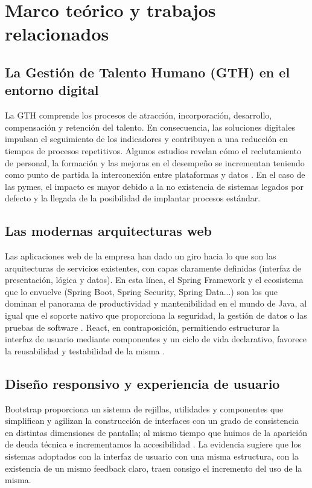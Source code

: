 \section{Marco teórico y trabajos relacionados}

\subsection{La Gestión de Talento Humano (GTH) en el entorno digital}
La GTH comprende los procesos de atracción, incorporación, desarrollo, compensación y retención del talento. En consecuencia, las soluciones digitales impulsan el seguimiento de los indicadores y contribuyen a una reducción en tiempos de procesos repetitivos. Algunos estudios revelan cómo el reclutamiento de personal, la formación y las mejoras en el desempeño se incrementan teniendo como punto de partida la interconexión entre plataformas y datos \cite{gestion_talento_digital}. En el caso de las pymes, el impacto es mayor debido a la no existencia de sistemas legados por defecto y la llegada de la posibilidad de implantar procesos estándar.

\subsection{Las modernas arquitecturas web}
Las aplicaciones web de la empresa han dado un giro hacia lo que son las arquitecturas de servicios existentes, con capas claramente definidas (interfaz de presentación, lógica y datos). En esta línea, el Spring Framework y el ecosistema que lo envuelve (Spring Boot, Spring Security, Spring Data...) son los que dominan el panorama de productividad y mantenibilidad en el mundo de Java, al igual que el soporte nativo que proporciona la seguridad, la gestión de datos o las pruebas de software \cite{estudio_aplicaciones_java}\cite{analisis_comparativo_java}. React, en contraposición, permitiendo estructurar la interfaz de usuario mediante componentes y un ciclo de vida declarativo, favorece la reusabilidad y testabilidad de la misma \cite{analisis_frameworks_frontend}.

\subsection{Diseño responsivo y experiencia de usuario}
Bootstrap proporciona un sistema de rejillas, utilidades y componentes que simplifican y agilizan la construcción de interfaces con un grado de consistencia en distintas dimensiones de pantalla; al mismo tiempo que huimos de la aparición de deuda técnica e incrementamos la accesibilidad \cite{optimizacion_bootstrap}. La evidencia sugiere que los sistemas adoptados con la interfaz de usuario con una misma estructura, con la existencia de un mismo feedback claro, traen consigo el incremento del uso de la misma.


